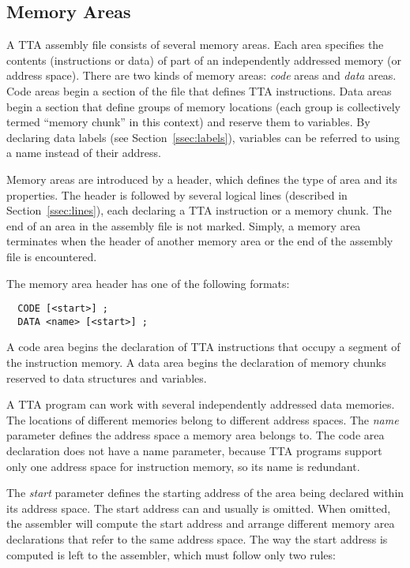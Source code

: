 \documentclass[twoside]{tceusermanual}
\begin{document}
\subsection{Memory Areas}

A TTA assembly file consists of several memory areas. Each area specifies
the contents (instructions or data) of part of an independently addressed
memory (or address space). There are two kinds of memory areas: \emph{code}
areas and \emph{data} areas. Code areas begin a section of the file that
defines TTA instructions.  Data areas begin a section that define groups of
memory locations (each group is collectively termed ``memory chunk'' in this
context) and reserve them to variables. By declaring data labels (see
Section~\ref{ssec:labels}), variables can be referred to using a name
instead of their address.

Memory areas are introduced by a header, which defines the type of area and
its properties. The header is followed by several logical lines (described
in Section~\ref{ssec:lines}), each declaring a TTA instruction or a memory
chunk.  The end of an area in the assembly file is not marked. Simply, a
memory area terminates when the header of another memory area or the end of
the assembly file is encountered.

The memory area header has one of the following formats:
\begin{verbatim}
  CODE [<start>] ;
  DATA <name> [<start>] ;
\end{verbatim}

A code area begins the declaration of TTA instructions that occupy a segment
of the instruction memory. A data area begins the declaration of memory
chunks reserved to data structures and variables.

A TTA program can work with several independently addressed data memories.
The locations of different memories belong to different address spaces. The
\emph{name} parameter defines the address space a memory area belongs
to. The code area declaration does not have a name parameter, because TTA
programs support only one address space for instruction memory, so its name
is redundant.

The \emph{start} parameter defines the starting address of the area being
declared within its address space. The start address can and usually is
omitted. When omitted, the assembler will compute the start address and
arrange different memory area declarations that refer to the same address
space. The way the start address is computed is left to the assembler, which
must follow only two rules:
\end{document}
